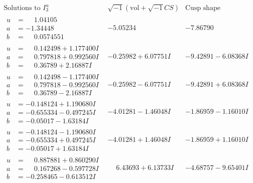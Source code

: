 \documentclass[1p]{elsarticle_modified}
\theoremstyle{definition}
\newcommand{\I}{\sqrt{-1}}
\begin{document}
$$\begin{array}{c|c|c}  
\text{Solutions to }I^u_{3}& \I (\text{vol} + \sqrt{-1}CS) & \text{Cusp shape}\\
 \hline 
\begin{aligned}
u &= \phantom{-}1.04105\phantom{ +0.000000I} \\
a &= -1.34448\phantom{ +0.000000I} \\
b &= \phantom{-}0.0574551\phantom{ +0.000000I}\end{aligned}
 & -5.05234\phantom{ +0.000000I} & -7.86790\phantom{ +0.000000I} \\ \hline\begin{aligned}
u &= \phantom{-}0.142498 + 1.177400 I \\
a &= \phantom{-}0.797818 + 0.992560 I \\
b &= \phantom{-}0.36789 + 2.16887 I\end{aligned}
 & -0.25982 + 6.07751 I & -9.42891 - 6.08368 I \\ \hline\begin{aligned}
u &= \phantom{-}0.142498 - 1.177400 I \\
a &= \phantom{-}0.797818 - 0.992560 I \\
b &= \phantom{-}0.36789 - 2.16887 I\end{aligned}
 & -0.25982 - 6.07751 I & -9.42891 + 6.08368 I \\ \hline\begin{aligned}
u &= -0.148124 + 1.190680 I \\
a &= -0.655334 - 0.497245 I \\
b &= -0.05017 - 1.63184 I\end{aligned}
 & -4.01281 - 1.46048 I & -1.86959 - 1.16010 I \\ \hline\begin{aligned}
u &= -0.148124 - 1.190680 I \\
a &= -0.655334 + 0.497245 I \\
b &= -0.05017 + 1.63184 I\end{aligned}
 & -4.01281 + 1.46048 I & -1.86959 + 1.16010 I \\ \hline\begin{aligned}
u &= \phantom{-}0.887881 + 0.860290 I \\
a &= \phantom{-}0.167268 - 0.597728 I \\
b &= -0.258465 - 0.613512 I\end{aligned}
 & \phantom{-}6.43693 + 6.13733 I & -4.68757 - 9.65401 I \\ \hline\begin{aligned}

\end{aligned}
\end{array}$$
\end{document}
